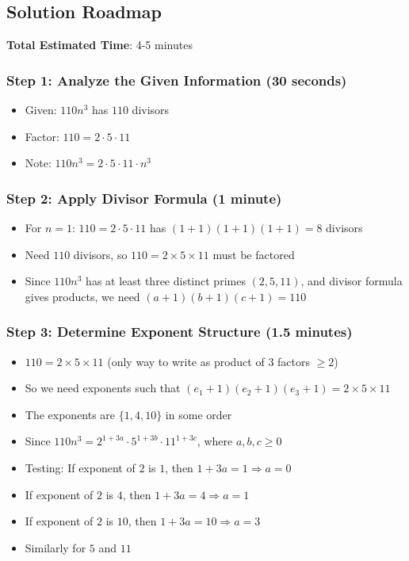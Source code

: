 \documentclass[]{article}
\begin{document}
\begin{solutionbox}
\subsection*{Solution Roadmap}

\textbf{Total Estimated Time}: 4-5 minutes

\subsubsection*{Step 1: Analyze the Given Information (30 seconds)}
\begin{itemize}
    \item Given: $110n^3$ has $110$ divisors
    \item Factor: $110 = 2 \cdot 5 \cdot 11$
    \item Note: $110n^3 = 2 \cdot 5 \cdot 11 \cdot n^3$
\end{itemize}

\subsubsection*{Step 2: Apply Divisor Formula (1 minute)}
\begin{itemize}
    \item For $n=1$: $110 = 2 \cdot 5 \cdot 11$ has $(1+1)(1+1)(1+1) = 8$ divisors
    \item Need $110$ divisors, so $110 = 2 \times 5 \times 11$ must be factored
    \item Since $110n^3$ has at least three distinct primes $(2, 5, 11)$, and divisor formula gives products, we need $(a+1)(b+1)(c+1) = 110$
\end{itemize}

\subsubsection*{Step 3: Determine Exponent Structure (1.5 minutes)}
\begin{itemize}
    \item $110 = 2 \times 5 \times 11$ (only way to write as product of 3 factors $\geq 2$)
    \item So we need exponents such that $(e_1+1)(e_2+1)(e_3+1) = 2 \times 5 \times 11$
    \item The exponents are $\{1, 4, 10\}$ in some order
    \item Since $110n^3 = 2^{1+3a} \cdot 5^{1+3b} \cdot 11^{1+3c}$, where $a,b,c \geq 0$
    \item Testing: If exponent of $2$ is $1$, then $1+3a = 1 \Rightarrow a = 0$
    \item If exponent of $2$ is $4$, then $1+3a = 4 \Rightarrow a = 1$ \checkmark
    \item If exponent of $2$ is $10$, then $1+3a = 10 \Rightarrow a = 3$ \checkmark
    \item Similarly for $5$ and $11$
\end{itemize}


\end{solutionbox}
\end{document}

